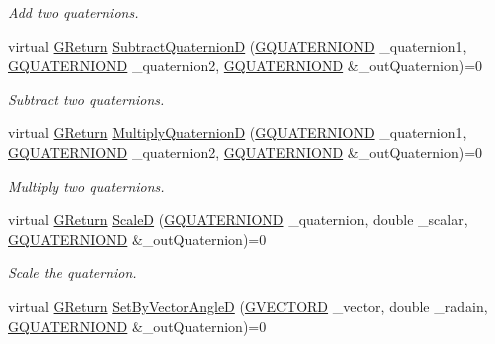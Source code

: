 \begin{DoxyCompactItemize}
\begin{DoxyCompactList}\small\item\em Add two quaternions. \end{DoxyCompactList}\item 
virtual \mbox{\hyperlink{namespaceGW_a67a839e3df7ea8a5c5686613a7a3de21}{G\+Return}} \mbox{\hyperlink{classGW_1_1MATH_1_1GQuaternion_a52f17b2b05d7ffa5176d7e83c40b9ffe}{Subtract\+QuaternionD}} (\mbox{\hyperlink{structGW_1_1MATH_1_1GQUATERNIOND}{G\+Q\+U\+A\+T\+E\+R\+N\+I\+O\+ND}} \+\_\+quaternion1, \mbox{\hyperlink{structGW_1_1MATH_1_1GQUATERNIOND}{G\+Q\+U\+A\+T\+E\+R\+N\+I\+O\+ND}} \+\_\+quaternion2, \mbox{\hyperlink{structGW_1_1MATH_1_1GQUATERNIOND}{G\+Q\+U\+A\+T\+E\+R\+N\+I\+O\+ND}} \&\+\_\+out\+Quaternion)=0
\begin{DoxyCompactList}\small\item\em Subtract two quaternions. \end{DoxyCompactList}\item 
virtual \mbox{\hyperlink{namespaceGW_a67a839e3df7ea8a5c5686613a7a3de21}{G\+Return}} \mbox{\hyperlink{classGW_1_1MATH_1_1GQuaternion_ae75906631438f250ab696aff9e117ede}{Multiply\+QuaternionD}} (\mbox{\hyperlink{structGW_1_1MATH_1_1GQUATERNIOND}{G\+Q\+U\+A\+T\+E\+R\+N\+I\+O\+ND}} \+\_\+quaternion1, \mbox{\hyperlink{structGW_1_1MATH_1_1GQUATERNIOND}{G\+Q\+U\+A\+T\+E\+R\+N\+I\+O\+ND}} \+\_\+quaternion2, \mbox{\hyperlink{structGW_1_1MATH_1_1GQUATERNIOND}{G\+Q\+U\+A\+T\+E\+R\+N\+I\+O\+ND}} \&\+\_\+out\+Quaternion)=0
\begin{DoxyCompactList}\small\item\em Multiply two quaternions. \end{DoxyCompactList}\item 
virtual \mbox{\hyperlink{namespaceGW_a67a839e3df7ea8a5c5686613a7a3de21}{G\+Return}} \mbox{\hyperlink{classGW_1_1MATH_1_1GQuaternion_ad65dc6353347a103c79a1e4f4a3b8534}{ScaleD}} (\mbox{\hyperlink{structGW_1_1MATH_1_1GQUATERNIOND}{G\+Q\+U\+A\+T\+E\+R\+N\+I\+O\+ND}} \+\_\+quaternion, double \+\_\+scalar, \mbox{\hyperlink{structGW_1_1MATH_1_1GQUATERNIOND}{G\+Q\+U\+A\+T\+E\+R\+N\+I\+O\+ND}} \&\+\_\+out\+Quaternion)=0
\begin{DoxyCompactList}\small\item\em Scale the quaternion. \end{DoxyCompactList}\item 
virtual \mbox{\hyperlink{namespaceGW_a67a839e3df7ea8a5c5686613a7a3de21}{G\+Return}} \mbox{\hyperlink{classGW_1_1MATH_1_1GQuaternion_a6d27eb89fc133c7746e2373cc2e0a3c4}{Set\+By\+Vector\+AngleD}} (\mbox{\hyperlink{structGW_1_1MATH_1_1GVECTORD}{G\+V\+E\+C\+T\+O\+RD}} \+\_\+vector, double \+\_\+radain, \mbox{\hyperlink{structGW_1_1MATH_1_1GQUATERNIOND}{G\+Q\+U\+A\+T\+E\+R\+N\+I\+O\+ND}} \&\+\_\+out\+Quaternion)=0

\end{DoxyCompactItemize}
